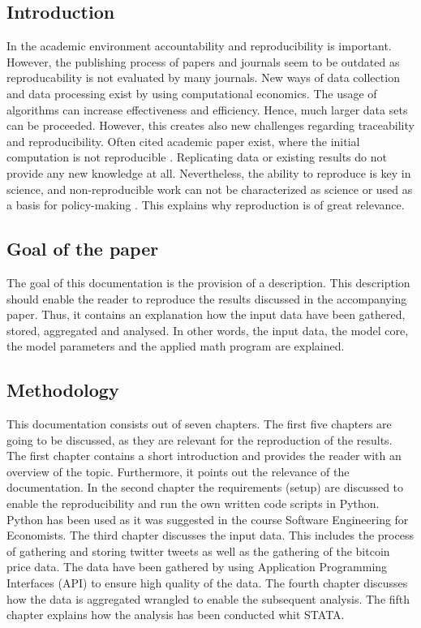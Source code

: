 \documentclass[a4paper,12pt]{article}
\begin{document}
\clearpage

\begin{spacing}{1.2}
\cleardoublepage{}

\section{Introduction}
In the academic environment accountability and reproducibility is important. However, the publishing process of papers and journals seem to be outdated as reproducability is not evaluated by many journals. \parencite[p.~888]{mccullough2003} New ways of data collection and data processing exist by using computational economics. The usage of algorithms can increase effectiveness and efficiency. Hence, much larger data sets can be proceeded. However, this creates also new challenges regarding traceability and reproducibility. Often cited academic paper exist, where the initial computation is not reproducible \parencite[pp.~874--887]{mccullough2003}. Replicating data or existing results do not provide any new knowledge at all. Nevertheless, the ability to reproduce is key in science, and non-reproducible work can not be characterized as science or used as a basis for policy-making \parencite[p.~888]{mccullough2003}. This explains why reproduction is of great relevance.

\subsection{Goal of the paper}
The goal of this documentation is the provision of a description. This description should enable the reader to reproduce the results discussed in the accompanying paper. Thus, it contains an explanation how the input data have been gathered, stored, aggregated and analysed. In other words, the input data, the model core, the model parameters and the applied math program are explained.

\subsection{Methodology}
This documentation consists out of seven chapters. The first five chapters are going to be discussed, as they are relevant for the reproduction of the results. The first chapter contains a short introduction and provides the reader with an overview of the topic. Furthermore, it points out the relevance of the documentation. In the second chapter the requirements (setup) are discussed to enable the reproducibility and run the own written code scripts in Python. Python has been used as it was suggested in the course Software Engineering for Economists. The third chapter discusses the input data. This includes the process of gathering and storing twitter tweets as well as the gathering of the bitcoin price data. The data have been gathered by using Application Programming Interfaces (API) to ensure high quality of the data. The fourth chapter discusses how the data is aggregated wrangled to enable the subsequent analysis. The fifth chapter explains how the analysis has been conducted whit STATA.


\end{spacing}
\end{document}
